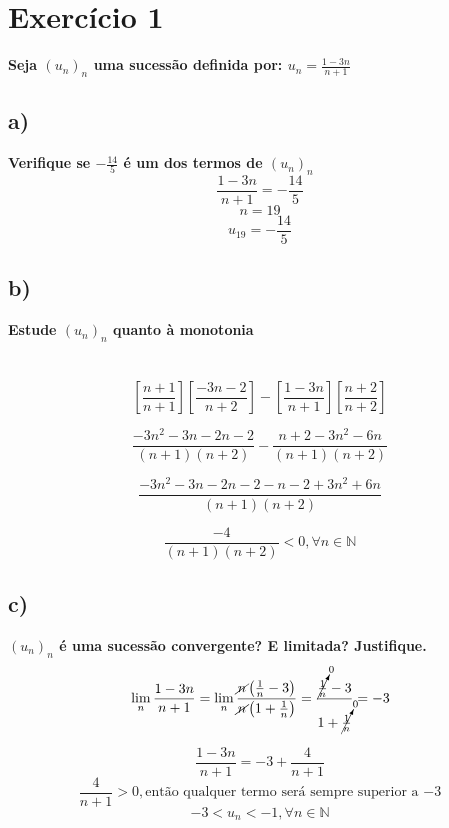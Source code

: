 \documentclass[a4paper]{article}
\begin{document}
	\section*{Exercício 1} \textbf{Seja $\left(u_{n}\right)_{n}$ uma sucessão definida por: $u_{n}=\frac{1-3n}{n+1}$}
	\subsection*{a)}
	\textbf{Verifique se $-\frac{14}{5}$ é um dos termos de $\left(u_{n}\right)_{n}$}
	\[\frac{1-3n}{n+1}=-\frac{14}{5}\]
	\[n=19\]
	\[u_{19}=-\frac{14}{5}\]
	\subsection*{b)}
	\textbf{Estude $\left(u_{n}\right)_{n}$ quanto à monotonia}\\
	\\
	\\
	\[\left[\frac{n+1}{n+1}\right]\left[\frac{-3n-2}{n+2}\right] - \left[\frac{1-3n}{n+1}\right]\left[\frac{n+2}{n+2}\right] \]
	
	\[\frac{-3n^2-3n-2n-2}{\left(n+1\right)\left(n+2\right)} - \frac{n+2-3n^2-6n}{\left(n+1\right)\left(n+2\right)}\]
	
	\[\frac{-3n^2-3n-2n-2-n-2+3n^2+6n}{\left(n+1\right)\left(n+2\right)}\]
	
	\[\frac{-4}{\left(n+1\right)\left(n+2\right)}<0, \forall n \in \mathbb{N}\]
	
	\subsection*{c)}
	\textbf{$\left(u_{n}\right)_{n}$ é uma sucessão convergente? E limitada? Justifique.}
	\[\lim\limits_{n}\frac{1-3n}{n+1} =
	\lim\limits_{n} \frac{\cancel{n}\left(\frac{1}{n}-3\right)}{\cancel{n}\left(1+ \frac{1}{n}\right)} = \frac{\cancelto{0}{\frac{1}{n}}-3}{1+ \cancelto{0}{\frac{1}{n}}} = -3\]
	
	
	\[\frac{1-3n}{n+1} = -3 + \frac{4}{n+1}\]
	\[\frac{4}{n+1} > 0, \text{então qualquer termo será sempre superior a $-3$} \]
	\[-3 < u_{n} < -1, \forall n \in \mathbb{N} \]
\\
\\
\end{document}
